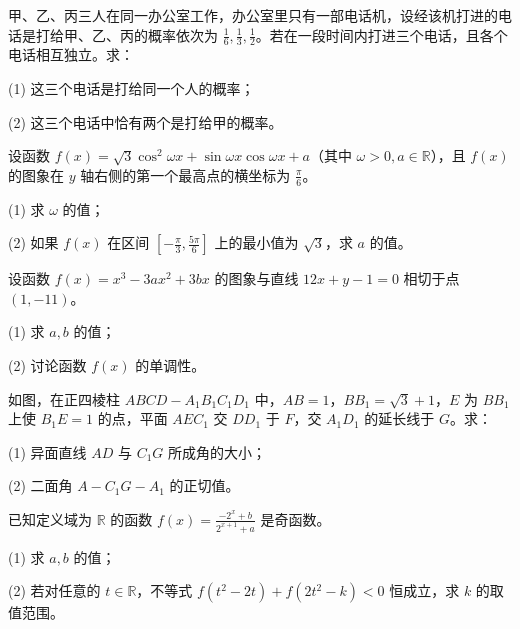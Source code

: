 \begin{question}
甲、乙、丙三人在同一办公室工作，办公室里只有一部电话机，设经该机打进的电话是打给甲、乙、丙的概率依次为 \(\frac16,\frac13,\frac12\)。若在一段时间内打进三个电话，且各个电话相互独立。求：

(1) 这三个电话是打给同一个人的概率；

(2) 这三个电话中恰有两个是打给甲的概率。

\end{question}
\begin{question}
设函数 \(f(x)=\sqrt3\cos^2\omega x+\sin\omega x\cos\omega x+a\)（其中 \(\omega>0, a\in\mathbb R\)），且 \(f(x)\) 的图象在 \(y\) 轴右侧的第一个最高点的横坐标为 \(\frac\pi6\)。

(1) 求 \(\omega\) 的值；

(2) 如果 \(f(x)\) 在区间 \(\left[-\frac\pi3,\frac{5\pi}6\right]\) 上的最小值为 \(\sqrt3\)，求 \(a\) 的值。

\end{question}
\begin{question}
设函数 \(f(x)=x^3-3ax^2+3bx\) 的图象与直线 \(12x+y-1=0\) 相切于点 \((1,-11)\)。

(1) 求 \(a,b\) 的值；

(2) 讨论函数 \(f(x)\) 的单调性。

\Needspace{0.4\textheight}
\end{question}
\begin{question}
如图，在正四棱柱 \(ABCD-A_1B_1C_1D_1\) 中，\(AB=1\)，\(BB_1=\sqrt3+1\)，\(E\) 为 \(BB_1\) 上使 \(B_1E=1\) 的点，平面 \(AEC_1\) 交 \(DD_1\) 于 \(F\)，交 \(A_1D_1\) 的延长线于 \(G\)。求：

(1) 异面直线 \(AD\) 与 \(C_1G\) 所成角的大小；

(2) 二面角 \(A-C_1G-A_1\) 的正切值。
\nopagebreak[4]
\begin{center}\end{center}
\nopagebreak[4]
\end{question}
\begin{question}
已知定义域为 \(\mathbb R\) 的函数 \(f(x)=\frac{-2^x+b}{2^{x+1}+a}\) 是奇函数。

(1) 求 \(a,b\) 的值；

(2) 若对任意的 \(t\in\mathbb R\)，不等式 \(f(t^2-2t)+f(2t^2-k)<0\) 恒成立，求 \(k\) 的取值范围。

\Needspace{0.4\textheight}
\end{question}

